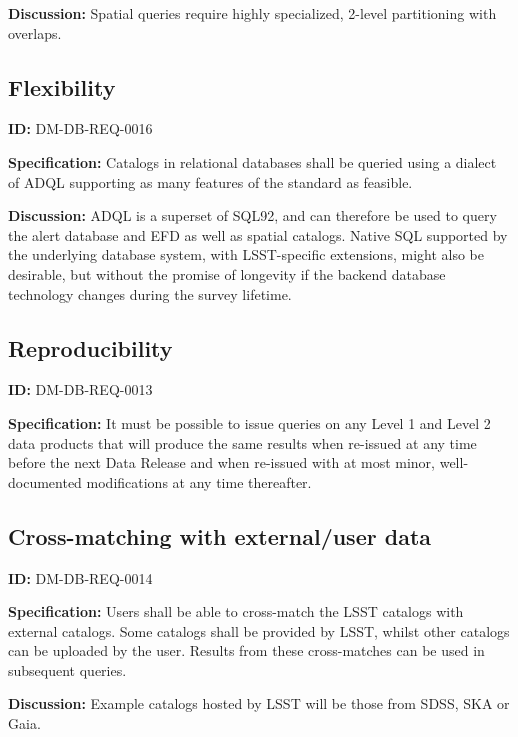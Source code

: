 \documentclass[SE,toc,lsstdraft]{lsstdoc}
\begin{document}
\textbf{Discussion:}
Spatial queries require highly specialized, 2-level partitioning with overlaps.

\subsection{Flexibility}

\label{DM-DB-REQ-0016}
\textbf{ID:} DM-DB-REQ-0016

\textbf{Specification:}
Catalogs in relational databases shall be queried using a dialect of ADQL supporting as many features of the standard as feasible.

\textbf{Discussion:}
ADQL is a superset of SQL92, and can therefore be used to query the alert database and EFD as well as spatial catalogs. Native SQL supported by the underlying database system, with LSST-specific extensions, might also be desirable, but without the promise of longevity if the backend database technology changes during the survey lifetime.

\subsection{Reproducibility}

\label{DM-DB-REQ-0013}
\textbf{ID:} DM-DB-REQ-0013

\textbf{Specification:}
It must be possible to issue queries on any Level 1 and Level 2 data products that will produce the same results when re-issued at any time before the next Data Release and when re-issued with at most minor, well-documented modifications at any time thereafter.

\subsection{Cross-matching with external/user data}

\label{DM-DB-REQ-0014}
\textbf{ID:} DM-DB-REQ-0014

\textbf{Specification:}
Users shall be able to cross-match the LSST catalogs with external catalogs. Some catalogs shall be provided by LSST, whilst other catalogs can be uploaded by the user. Results from these cross-matches can be used in subsequent queries.

\textbf{Discussion:}
Example catalogs hosted by LSST will be those from SDSS, SKA or Gaia.


\end{document}
